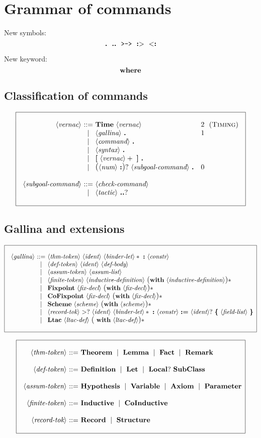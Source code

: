 \documentclass{article}
\makeatletter
\def\GR#1{\text{\large(}#1\text{\large)}}
\def\NT#1{\langle\textit{#1}\rangle}
\def\TERM#1{{\bf\textrm{\bf #1}}}
\def\KWD#1{\TERM{#1}}
\def\STAR#1{#1*}
\def\STARGR#1{\GR{#1}*}
\def\PLUS#1{#1+}
\def\OPT#1{#1?}
\def\OPTGR#1{\GR{#1}?}
\newenvironment{cadre}
        {\begin{array}{|c|}\hline\\}
        {\\\\\hline\end{array}}
\newenvironment{rulebox}
        {$$\begin{cadre}\begin{array}{r@{~}c@{~}l@{}l@{}r}}
        {\end{array}\end{cadre}$$}
\def\DEFNT#1{\NT{#1} & ::= &}
\def\RNAME#1{(\textsc{#1})}
\def\SEPDEF{\\\\}
\def\nlsep{\\&|&}
\newenvironment{rules}
        {\begin{center}\begin{rulebox}}
        {\end{rulebox}\end{center}}
\makeatother
\begin{document}
\section{Grammar of commands}

New symbols:
$$ \TERM{.}
~~ \TERM{..}
~~ \TERM{\tt >->}
~~ \TERM{:$>$}
~~ \TERM{$<$:}
$$

New keyword:
$$ \KWD{where}
$$

\subsection{Classification of commands}

\begin{rules}
\DEFNT{vernac}
       \TERM{Time}~\NT{vernac}  &2~~ &\RNAME{Timing}
\nlsep \NT{gallina}~\TERM{.}    &1
\nlsep \NT{command}~\TERM{.}
\nlsep \NT{syntax}~\TERM{.}
\nlsep \TERM{[}~\PLUS{\NT{vernac}}~\TERM{]}~\TERM{.}
\nlsep \OPTGR{\NT{num}~\KWD{:}}~\NT{subgoal-command}~\TERM{.} ~~~&0
\SEPDEF
\DEFNT{subgoal-command}
       \NT{check-command}
\nlsep %
   \NT{tactic}~\OPT{\KWD{..}}
\end{rules}

\subsection{Gallina and extensions}

\begin{rules}
\DEFNT{gallina}
       \NT{thm-token}~\NT{ident}~\STAR{\NT{binder-let}}~\KWD{:}~\NT{constr}
\nlsep \NT{def-token}~\NT{ident}~\NT{def-body}
\nlsep \NT{assum-token}~\NT{assum-list}
\nlsep \NT{finite-token}~\NT{inductive-definition}
      ~\STARGR{\KWD{with}~\NT{inductive-definition}}
\nlsep \TERM{Fixpoint}~\NT{fix-decl}~\STARGR{\KWD{with}~\NT{fix-decl}}
\nlsep \TERM{CoFixpoint}~\NT{fix-decl}~\STARGR{\KWD{with}~\NT{fix-decl}}
\nlsep \TERM{Scheme}~\NT{scheme}~\STARGR{\KWD{with}~\NT{scheme}}
\nlsep \NT{record-tok}~\OPT{\TERM{$>$}}~\NT{ident}~\STAR{\NT{binder-let}}
       ~\KWD{:}~\NT{constr}~\KWD{:=}
       ~\OPT{\NT{ident}}~\KWD{\{}~\NT{field-list}~\KWD{\}}
\nlsep \TERM{Ltac}~\NT{ltac-def}~\STARGR{~\TERM{with}~\NT{ltac-def}}
\end{rules}

\begin{rules}
\DEFNT{thm-token}
   \TERM{Theorem} ~\mid~ \TERM{Lemma} ~\mid~ \TERM{Fact} ~\mid~ \TERM{Remark}
\SEPDEF
\DEFNT{def-token}
   \TERM{Definition} ~\mid~ \TERM{Let} ~\mid~
   \OPT{\TERM{Local}}~\TERM{SubClass}
\SEPDEF
\DEFNT{assum-token}
    \TERM{Hypothesis} ~\mid~ \TERM{Variable} ~\mid~ \TERM{Axiom} ~\mid~
    \TERM{Parameter}
\SEPDEF
\DEFNT{finite-token}
    \TERM{Inductive} ~\mid~ \TERM{CoInductive}
\SEPDEF
\DEFNT{record-tok}
    \TERM{Record} ~\mid~ \TERM{Structure}
\end{rules}
\end{document}
